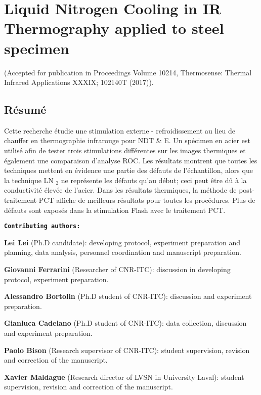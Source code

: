 

\chapter{Liquid Nitrogen Cooling in IR Thermography applied to steel specimen}
(Accepted for publication in Proceedings Volume 10214, Thermosense: Thermal Infrared Applications XXXIX; 102140T (2017)).


%
\section*{Résumé}
Cette recherche étudie une stimulation externe - refroidissement au lieu de chauffer en thermographie infrarouge pour NDT \& E. Un spécimen en acier est utilisé afin de  tester trois stimulations différentes sur les images thermiques et également une comparaison d'analyse ROC. Les résultats montrent que toutes les techniques mettent en évidence une partie des défauts de l'échantillon, alors que la technique LN $ _2 $ ne représente les défauts qu'au début; ceci peut être dû à la conductivité élevée de l'acier. Dans les résultats thermiques, la méthode de post-traitement PCT affiche de meilleurs résultats pour toutes les procédures. Plus de défauts sont exposés dans la stimulation Flash avec le traitement PCT.

\textbf{\texttt{Contributing authors:}}

\textbf{\textsf{Lei Lei}} (Ph.D candidate): developing protocol, experiment preparation and planning, data analysis,  personnel coordination and manuscript preparation.

\textbf{Giovanni Ferrarini} (Researcher of CNR-ITC): discussion in developing protocol, experiment preparation.

\textbf{Alessandro Bortolin} (Ph.D student of CNR-ITC): discussion and experiment preparation.

\textbf{Gianluca Cadelano} (Ph.D student of CNR-ITC): data collection, discussion and experiment preparation.

\textbf{Paolo Bison} (Research supervisor of CNR-ITC): student supervision, revision and correction of the manuscript. 

\textbf{Xavier Maldague} (Research director of LVSN in University Laval): student supervision, revision and correction of the manuscript.


